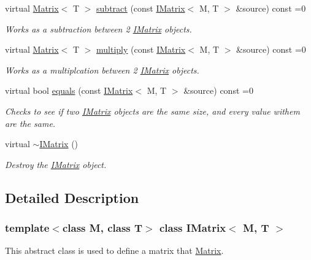 \begin{DoxyCompactItemize}
virtual \mbox{\hyperlink{class_matrix}{Matrix}}$<$ T $>$ \mbox{\hyperlink{class_i_matrix_a0bf5046efed75799656059ce2980a851}{subtract}} (const \mbox{\hyperlink{class_i_matrix}{I\+Matrix}}$<$ M, T $>$ \&source) const =0
\begin{DoxyCompactList}\small\item\em Works as a subtraction between 2 \mbox{\hyperlink{class_i_matrix}{I\+Matrix}} objects. \end{DoxyCompactList}\item 
virtual \mbox{\hyperlink{class_matrix}{Matrix}}$<$ T $>$ \mbox{\hyperlink{class_i_matrix_aa4d4f7ce2daec7d68ff8fd590652544d}{multiply}} (const \mbox{\hyperlink{class_i_matrix}{I\+Matrix}}$<$ M, T $>$ \&source) const =0
\begin{DoxyCompactList}\small\item\em Works as a multiplcation between 2 \mbox{\hyperlink{class_i_matrix}{I\+Matrix}} objects. \end{DoxyCompactList}\item 
virtual bool \mbox{\hyperlink{class_i_matrix_afa03122ed7ddb531656ce27690f8fb03}{equals}} (const \mbox{\hyperlink{class_i_matrix}{I\+Matrix}}$<$ M, T $>$ \&source) const =0
\begin{DoxyCompactList}\small\item\em Checks to see if two \mbox{\hyperlink{class_i_matrix}{I\+Matrix}} objects are the same size, and every value withem are the same. \end{DoxyCompactList}\item 
virtual \mbox{\hyperlink{class_i_matrix_a72b86d932b115897d81b768343aa5dd3}{$\sim$\+I\+Matrix}} ()
\begin{DoxyCompactList}\small\item\em Destroy the \mbox{\hyperlink{class_i_matrix}{I\+Matrix}} object. \end{DoxyCompactList}\end{DoxyCompactItemize}


\subsection{Detailed Description}
\subsubsection*{template$<$class M, class T$>$\newline
class I\+Matrix$<$ M, T $>$}

This abstract class is used to define a matrix that \mbox{\hyperlink{class_matrix}{Matrix}}. 

